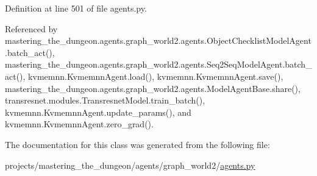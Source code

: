Definition at line 501 of file agents.\+py.



Referenced by mastering\+\_\+the\+\_\+dungeon.\+agents.\+graph\+\_\+world2.\+agents.\+Object\+Checklist\+Model\+Agent.\+batch\+\_\+act(), mastering\+\_\+the\+\_\+dungeon.\+agents.\+graph\+\_\+world2.\+agents.\+Seq2\+Seq\+Model\+Agent.\+batch\+\_\+act(), kvmemnn.\+Kvmemnn\+Agent.\+load(), kvmemnn.\+Kvmemnn\+Agent.\+save(), mastering\+\_\+the\+\_\+dungeon.\+agents.\+graph\+\_\+world2.\+agents.\+Model\+Agent\+Base.\+share(), transresnet.\+modules.\+Transresnet\+Model.\+train\+\_\+batch(), kvmemnn.\+Kvmemnn\+Agent.\+update\+\_\+params(), and kvmemnn.\+Kvmemnn\+Agent.\+zero\+\_\+grad().



The documentation for this class was generated from the following file\+:\begin{DoxyCompactItemize}
\item 
projects/mastering\+\_\+the\+\_\+dungeon/agents/graph\+\_\+world2/\hyperlink{projects_2mastering__the__dungeon_2agents_2graph__world2_2agents_8py}{agents.\+py}\end{DoxyCompactItemize}

